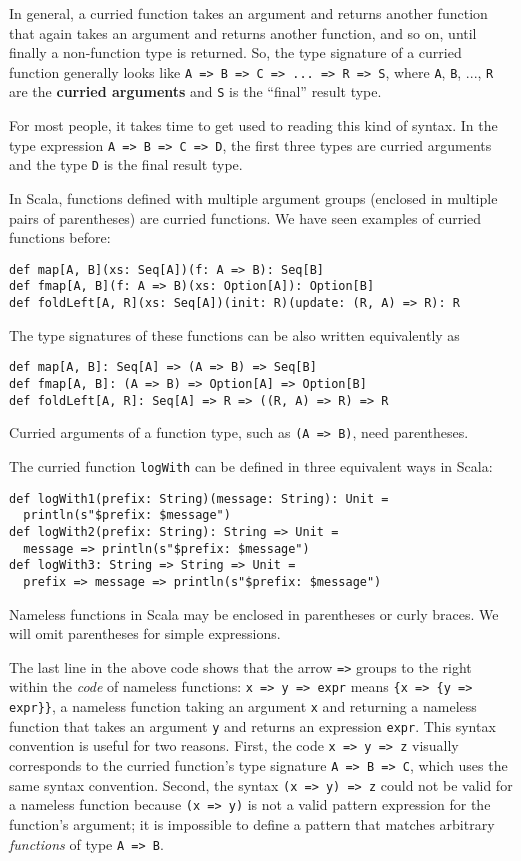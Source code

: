 In general, a curried function takes an argument and returns another
function that again takes an argument and returns another function,
and so on, until finally a non-function type is returned. So, the
type signature of a curried function generally looks like \lstinline!A => B => C => ... => R => S!,
where \lstinline!A!, \lstinline!B!, ..., \lstinline!R! are the
\textbf{curried arguments} and \lstinline!S!
is the ``final'' result type.

For most people, it takes time to get used to reading this kind of
syntax. In the type expression \lstinline!A => B => C => D!, the
first three types are curried arguments and the type \lstinline!D!
is the final result type.

In Scala, functions defined with multiple argument groups (enclosed
in multiple pairs of parentheses) are curried functions. We have seen
examples of curried functions before:
\begin{lstlisting}
def map[A, B](xs: Seq[A])(f: A => B): Seq[B]
def fmap[A, B](f: A => B)(xs: Option[A]): Option[B]
def foldLeft[A, R](xs: Seq[A])(init: R)(update: (R, A) => R): R
\end{lstlisting}
The type signatures of these functions can be also written equivalently
as
\begin{lstlisting}
def map[A, B]: Seq[A] => (A => B) => Seq[B]
def fmap[A, B]: (A => B) => Option[A] => Option[B]
def foldLeft[A, R]: Seq[A] => R => ((R, A) => R) => R
\end{lstlisting}
Curried arguments of a function type, such as \lstinline!(A => B)!,
need parentheses.

The curried function \lstinline!logWith! can be defined in three
equivalent ways in Scala:
\begin{lstlisting}
def logWith1(prefix: String)(message: String): Unit =
  println(s"$prefix: $message")
def logWith2(prefix: String): String => Unit =
  message => println(s"$prefix: $message")
def logWith3: String => String => Unit =
  prefix => message => println(s"$prefix: $message")
\end{lstlisting}
Nameless functions in Scala may be enclosed in parentheses or curly
braces. We will omit parentheses for simple expressions.

The last line in the above code shows that the arrow \lstinline!=>!
groups to the right within the \emph{code} of nameless functions:
\lstinline!x => y => expr! means \lstinline!{x => {y => expr}}!,
a nameless function taking an argument \lstinline!x! and returning
a nameless function that takes an argument \lstinline!y! and returns
an expression \lstinline!expr!. This syntax convention is useful
for two reasons. First, the code \lstinline!x => y => z! visually
corresponds to the curried function's type signature \lstinline!A => B => C!,
which uses the same syntax convention. Second, the syntax \lstinline!(x => y) => z!
could not be valid for a nameless function because \lstinline!(x => y)!
is not a valid pattern expression for the function's argument; it
is impossible to define a pattern that matches arbitrary \emph{functions}
of type \lstinline!A => B!. 

